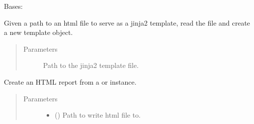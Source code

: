 \documentclass[letterpaper,10pt,english]{sphinxmanual}
\begin{document}
\begin{fulllineitems}
\label{\detokenize{polo.utils:polo.utils.io_utils.HtmlWriter}}
Bases: {\hyperref[\detokenize{polo.utils:polo.utils.io_utils.RunSerializer}]{}}

\begin{fulllineitems}
\label{\detokenize{polo.utils:polo.utils.io_utils.HtmlWriter.make_template}}
Given a path to an html file to serve as a jinja2 template, read the
file and create a new template object.
\begin{quote}\begin{description}
\item[{Parameters}] \leavevmode
{} \textendash{} Path to the jinja2 template file.

\end{description}\end{quote}

\end{fulllineitems}


\begin{fulllineitems}
\label{\detokenize{polo.utils:polo.utils.io_utils.HtmlWriter.write_complete_run}}
Create an HTML report from a  or 
instance.
\begin{quote}\begin{description}
\item[{Parameters}] \leavevmode\begin{itemize}
\item {} 
 () \textendash{} Path to write html file to.


\end{itemize}
\end{description}
\end{quote}
\end{fulllineitems}
\end{fulllineitems}
\end{document}
